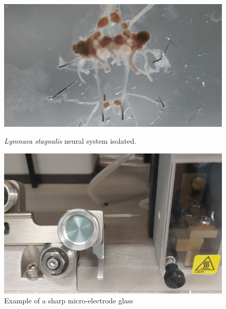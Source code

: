\begin{figure}[hbt!]
	\centering
	\begin{minipage}{0.4\textwidth}
		\centering
		\includegraphics[angle=180,width=0.99\linewidth]{img/methods/IMG00027.jpg}
		\caption{\textit{Lymnaea stagnalis} neural system isolated.}
		\label{fig:preparation}
	\end{minipage}
	\hfill
	\begin{minipage}{0.4\textwidth}
		\centering
		\includegraphics[width=0.99\linewidth]{img/methods/preparation/electrode4_zoom.jpg}
		\caption{Example of a sharp micro-electrode glass}
		\label{fig:electrode}
	\end{minipage}
\end{figure}


